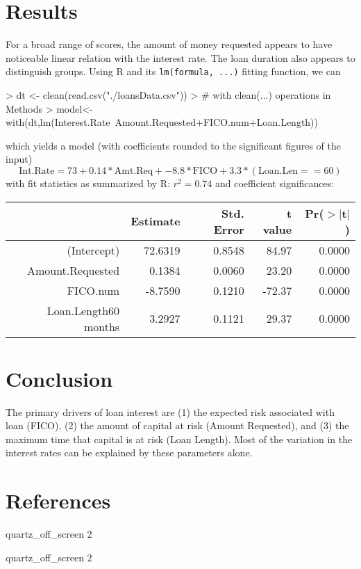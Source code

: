 \documentclass{article}
\begin{document}
\section{Results}
For a broad range of scores, the amount of money requested appears to have noticeable linear relation with the interest rate.  The loan duration also appears to distinguish groups.  Using R and its \texttt{lm(formula, ...)} fitting function, we can
\begin{Schunk}
\begin{Sinput}
> dt <- clean(read.csv("./loansData.csv"))
> # with clean(...) operations in Methods
> model<-with(dt,{lm(Interest.Rate~Amount.Requested+FICO.num+Loan.Length)})
\end{Sinput}
\end{Schunk}
which yields a model (with coefficients rounded to the significant figures of the input)
$$
\textrm{Int.Rate} = 73 + 0.14*\textrm{Amt.Req} + -8.8*\textrm{FICO} + 3.3*(\textrm{Loan.Len} == 60)
$$
with fit statistics as summarized by R: $r^2 = 0.74$ and coefficient significances:
\begin{table}[ht]
\centering
\begin{tabular}{rrrrr}
  \hline
 & Estimate & Std. Error & t value & Pr($>$$|$t$|$) \\ 
  \hline
(Intercept) & 72.6319 & 0.8548 & 84.97 & 0.0000 \\ 
  Amount.Requested & 0.1384 & 0.0060 & 23.20 & 0.0000 \\ 
  FICO.num & -8.7590 & 0.1210 & -72.37 & 0.0000 \\ 
  Loan.Length60 months & 3.2927 & 0.1121 & 29.37 & 0.0000 \\ 
   \hline
\end{tabular}
\end{table}
\section{Conclusion}
The primary drivers of loan interest are (1) the expected risk associated with loan (FICO), (2) the amount of capital at risk (Amount Requested), and (3) the maximum time that capital is at risk (Loan Length).  Most of the variation in the interest rates can be explained by these parameters alone.

\section{References}


\begin{Schunk}
\begin{Soutput}
quartz_off_screen 
                2 
\end{Soutput}
\begin{Soutput}
quartz_off_screen 
                2 
\end{Soutput}
\end{Schunk}
\end{document}
